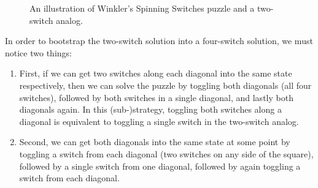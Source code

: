 \begin{figure}
  \center
  \caption[Illustration of Winkler's Spinning Switches and a two-switch analog.]{
    An illustration of Winkler's Spinning Switches puzzle and a two-switch analog.
  }
  \label{fig:twoSwitches}
\end{figure}

In order to bootstrap the two-switch solution into a four-switch solution,
we must notice two things: \begin{enumerate}
  \item First, if we can get two switches along each diagonal into the same state
  respectively, then we can solve the puzzle by toggling both diagonals
  (all four switches),
  followed by both switches in a single diagonal,
  and lastly both diagonals again.
  In this (sub-)strategy, toggling both switches along a diagonal is
  equivalent to toggling a single switch in the two-switch analog.

  \item Second, we can get both diagonals into the same state at some point
  by toggling a switch from each diagonal (two switches on any side of the square),
  followed by a single switch from one diagonal,
  followed by again toggling a switch from each diagonal.
\end{enumerate}


